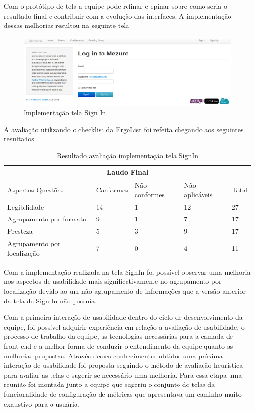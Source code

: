 Com o protótipo de tela a equipe pode refinar e opinar sobre como seria o resultado final e contribuir com a evolução das interfaces. A implementação dessas melhorias resultou na seguinte tela

\graphicspath{{figuras/}}
\begin{figure}[H]
\centering
\includegraphics[width=1.0\textwidth]{TelaSignIn}
\caption{Implementação tela Sign In}
\label{parallel-coordinate}
\end{figure}

A avaliação utilizando o checklist da ErgoList foi refeita chegando aos seguintes resultados

\begin{table}[H]
\begin{tabular}{|l|l|l|l|l|}
\hline
\multicolumn{5}{|c|}{\textbf{Laudo Final}}                                       \\ \hline
Aspectos-Questões           & Conformes & Não conformes & Não aplicáveis & Total \\ \hline
Legibilidade                & 14        & 1             & 12             & 27    \\ \hline
Agrupamento por formato     & 9         & 1             & 7              & 17    \\ \hline
Presteza                    & 5         & 3             & 9              & 17    \\ \hline
Agrupamento por localização & 7         & 0             & 4              & 11    \\ \hline
\end{tabular}
\caption{Resultado avaliação implementação tela SignIn}
\end{table}

Com a implementação realizada na tela SignIn foi possível observar uma melhoria nos aspectos de usabilidade mais significativamente no agrupamento por localização devido ao um não agrupamento de informações que a versão anterior da tela de Sign In não possuía.

Com a primeira interação de usabilidade dentro do ciclo de desenvolvimento da equipe, foi possível adquirir experiência em relação a avaliação de usabilidade, o processo de trabalho da equipe, as tecnologias necessárias para a camada de front-end e a melhor forma de conduzir o entendimento da equipe quanto as melhorias propostas. Através desses conhecimentos obtidos uma próxima interação de usabilidade foi proposta seguindo o método de avaliação heurística para avaliar as telas e sugerir se necessário uma melhoria. Para essa etapa uma reunião foi montada junto a equipe que sugeriu o conjunto de telas da funcionalidade de configuração de métricas que apresentava um caminho muito exaustivo para o usuário.

